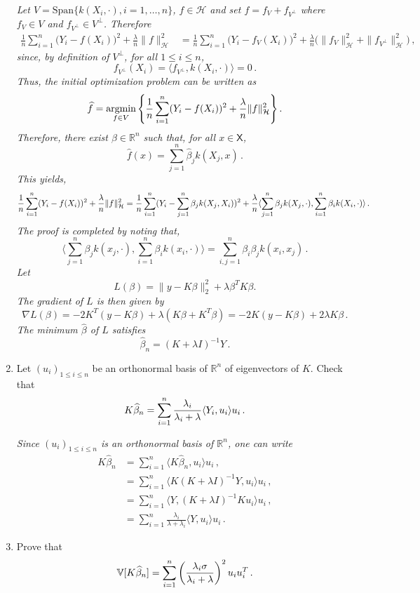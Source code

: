 \documentclass[a4paper,10pt,fleqn]{article}
\newcommand{\eqsp}{\,}
\newcommand{\R}{\ensuremath{\mathbb{R}}}
\newcommand{\xset}{\ensuremath{\mathsf{X}}}
\newcommand{\V}{\ensuremath{\mathbb{V}}}
\newcommand{\1}{\ensuremath{\mathbbm{1}}}
\newcommand{\argmin}{\mathop{\textrm{argmin}}}
\begin{document}
\begin{enumerate}
{\em
Let  $V = \textrm{Span}\{k(X_i, \cdot), i=1, \hdots, n\}$,  $f \in \mathcal{H}$ and set $f = f_V + f_{V^{\perp}}$ where $f_V \in V$ and $f_{V^{\perp}} \in V^{\perp}$. Therefore
		\begin{align*}
			\frac{1}{n} \sum_{i=1}^n \Big( Y_i - f(X_i) \Big)^2 + \frac{\lambda}{n} \|f\|_{\mathcal{H}}^2
			& = 	\frac{1}{n} \sum_{i=1}^n \Big( Y_i - f_V(X_i) \Big)^2 + \frac{\lambda}{n} \Big( \|f_V\|_{\mathcal{H}}^2 + \|f_{V^{\perp}}\|_{\mathcal{H}}^2 \Big)\,,
		\end{align*}	
		since, by definition of $V^{\perp}$, for all $1 \leqslant i \leqslant n$,  
		$$
		f_{V^{\perp}}(X_i) = \langle f_{V^{\perp}} , k(X_i, \cdot) \rangle = 0\,. 
		$$
		Thus, the initial optimization problem can be written as
$$
\widehat f=\argmin_{f\in V}\left\{{1\over n}\sum_{i=1}^n(Y_{i}-f(X_{i}))^2+{\lambda\over n} \|f\|_{\mathcal{H}}^2\right\}.
$$
Therefore, there exist $\beta\in\mathbb{R}^n$ such that, for all $x\in\xset$,
$$
\widehat{f}(x) = \sum_{j=1}^n \widehat{\beta}_j k(X_j, x)\,.
$$
This yields,
$$
{1\over n}\sum_{i=1}^n(Y_{i}-f(X_{i}))^2+{\lambda\over n} \|f\|_{\mathcal{H}}^2 = {1\over n}\sum_{i=1}^n(Y_{i}-\sum_{j=1}^n \beta_j k(X_j, X_i))^2+{\lambda\over n} \langle \sum_{j=1}^n \beta_j k(X_j, \cdot), \sum_{i=1}^n \beta_i k(X_i, \cdot) \rangle\,.
$$
The proof is completed by noting that,
$$
\langle \sum_{j=1}^n \beta_j k(x_j, \cdot), \sum_{i=1}^n \beta_i k(x_i, \cdot) \rangle  = \sum_{i,j=1}^n \beta_i \beta_j k(x_i, x_j)\,.
$$
Let 
$$
L(\beta) = \| y - K \beta\|_2^2 + \lambda \beta^T K \beta.
$$
The gradient of $L$ is then given by
$$
\nabla L (\beta)  = -2K^T (y - K \beta) + \lambda (K \beta + K^T \beta)   = -2K(y-K \beta) + 2 \lambda K \beta\,.
$$
The minimum $\widehat{\beta}$ of $L$ satisfies 
$$
\widehat{\beta}_n = (K + \lambda I)^{-1} Y\,.
$$
}
\item  Let $(u_i)_{1 \leq i \leq n}$ be an orthonormal basis of $\R^n$ of eigenvectors of $K$. Check that 
$$
K\widehat \beta_n= \sum_{i=1}^n {\lambda_{i}\over \lambda_{i}+\lambda} \langle Y_i, u_{i}\rangle u_{i}\,.
$$


\vspace{.2cm}

{\em
Since $(u_i)_{1 \leq i \leq n}$ is an orthonormal basis of $\R^n$, one can write  
		\begin{align*}
			K \widehat{\beta}_n & = \sum_{i=1}^n \langle K \widehat{\beta}_n, u_i\rangle u_i\,,\\
			& = \sum_{i=1}^n \langle K (K+\lambda I)^{-1}Y, u_i\rangle u_i\,,\\
			& = \sum_{i=1}^n \langle Y, (K+\lambda I)^{-1} K  u_i\rangle u_i\,,\\
			& = \sum_{i=1}^n \frac{\lambda_i }{\lambda + \lambda_i} \langle Y, u_i \rangle u_i\,.
		\end{align*}
}
\item Prove that
$$
\V[K\widehat \beta_n]=\sum_{i=1}^n \left(\lambda_{i}\sigma\over \lambda_{i}+\lambda\right)^2u_{i}u_{i}^T\eqsp.
$$


\end{enumerate}
\end{document}
